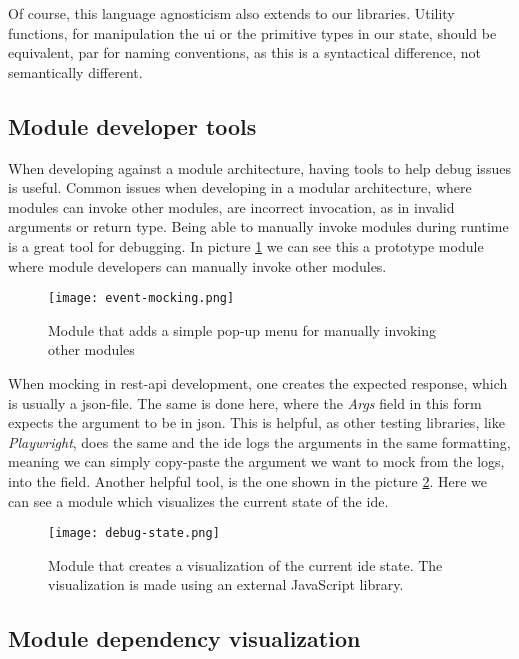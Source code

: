 Of course, this language agnosticism also extends to our libraries. Utility
functions, for manipulation the \gls*{ui} or the primitive types in our state,
should be equivalent, par for naming conventions, as this is a syntactical
difference, not semantically different.


\subsection{Module developer tools}

When developing against a module architecture, having tools to help debug issues
is useful. Common issues when developing in a modular architecture, where
modules can invoke other modules, are incorrect invocation, as in invalid
arguments or return type. Being able to manually invoke modules during runtime
is a great tool for debugging. In picture \ref{pic:eventMock} we can see this a
prototype module where module developers can manually invoke other modules.

\begin{figure}[H]
  \centering
  \texttt{[image: event-mocking.png]}
  \caption{
    Module that adds a simple pop-up menu for manually invoking other modules
  }
  \label{pic:eventMock}
\end{figure}

When mocking in \gls*{rest}-\gls*{api} development, one creates the expected
response, which is usually a \gls*{json}-file. The same is done here, where the
\textit{Args} field in this form expects the argument to be in \gls*{json}. This
is helpful, as other testing libraries, like \textit{Playwright}, does the same
and the \gls*{ide} logs the arguments in the same formatting, meaning we
can simply copy-paste the argument we want to mock from the logs, into the
field. Another helpful tool, is the one shown in the picture
\ref{pic:debugState}. Here we can see a module which visualizes the current
state of the \gls*{ide}.

\begin{figure}[H]
  \centering
  \texttt{[image: debug-state.png]}
  \caption{
    Module that creates a visualization of the current \gls*{ide} state. The
    visualization is made using an external JavaScript library.
  }
  \label{pic:debugState}
\end{figure}


\subsection{Module dependency visualization}

